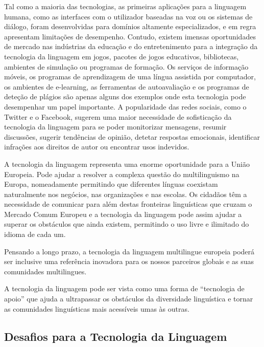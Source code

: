 \begin{multicols}{2}
Tal como a maioria das tecnologias, as primeiras aplicações para a linguagem humana, como as interfaces com o utilizador baseadas na voz 
ou os sistemas de diálogo, foram desenvolvidas para domínios altamente especializados, e em regra apresentam limitações de desempenho. 
Contudo, existem imensas oportunidades de mercado nas indústrias da educação e do entretenimento para a integração da tecnologia da linguagem em jogos, 
pacotes de jogos e\-du\-ca\-ti\-vos, bibliotecas, ambientes de simulação ou programas de formação. 
Os serviços de informação móveis, os programas de aprendizagem de uma língua assistida por computador, os ambientes de e-learning, as ferramentas de autoavaliação e os programas de deteção de plágios são apenas alguns dos exemplos onde esta tecnologia pode desempenhar um papel importante. A popularidade das redes sociais, como o Twitter e o Facebook, sugerem uma maior necessidade de sofisticação da tecnologia da linguagem para se poder monitorizar mensagens, resumir discussões, sugerir tendências de opinião, detetar respostas emocionais, identificar infrações aos direitos de autor ou encontrar usos indevidos.


A tecnologia da linguagem representa uma enorme oportunidade para a União Europeia. Pode ajudar a resolver a complexa questão do multilinguismo na Europa, nomeadamente permitindo que diferentes línguas coexistam naturalmente nos negócios, nas organizações e nas escolas. Os cidadãos têm a necessidade de comunicar para além destas fronteiras linguísticas que cruzam o Mercado Comum Europeu e a tecnologia da linguagem pode assim ajudar a superar os obstáculos que ainda existem, permitindo o uso livre e ilimitado do idioma de cada um. 

Pensando a longo prazo, a tecnologia da linguagem multilingue europeia poderá ser inclusive
uma referência inovadora para os nossos parceiros globais e as suas comunidades multilingues. 

A tecnologia da linguagem pode ser vista como uma forma de “tecnologia de apoio” que ajuda a ultrapassar os obstáculos da diversidade linguística e tornar as comunidades linguísticas mais acessíveis umas às outras.


\subsection{Desafios para a Tecnologia da Linguagem}


\end{multicols}
